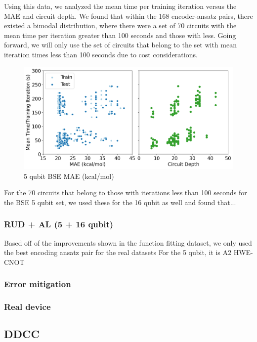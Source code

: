 \documentclass[journal=jacsat,manuscript=article]{achemso}
\begin{document}
Using this data, we analyzed the mean time per training iteration versus the MAE and circuit depth. 
We found that within the 168 encoder-ansatz pairs, there existed a bimodal distribution, where there were a set of 70 circuits with the mean time per iteration greater than 100 seconds and those with less.
Going forward, we will only use the set of circuits that belong to the set with mean iteration times less than 100 seconds due to cost considerations.
\begin{figure}[H]
	\centering
	\includegraphics[width=\textwidth]{images/BSE/AllBSE5_circuitdepth_MAE_vs_iterationtime.png}
	\caption{5 qubit BSE MAE (kcal/mol)}
	\label{fig:AllBSE5_circuitdepth_MAE_vs_iterationtime}
\end{figure}

For the 70 circuits that belong to those with iterations less than 100 seconds for the BSE 5 qubit set, we used these for the 16 qubit as well and found that...



\subsubsection{RUD + AL (5 + 16 qubit)}
Based off of the improvements shown in the function fitting dataset, we only used the best encoding ansatz pair for the real datasets
For the 5 qubit, it is A2 HWE-CNOT


\subsubsection{Error mitigation}
\subsubsection{Real device}

\subsection{DDCC} 
\end{document}
